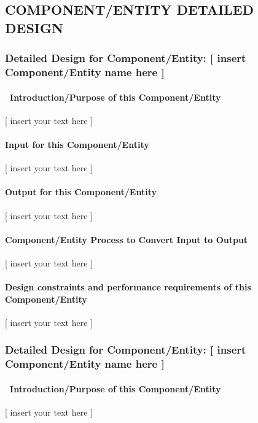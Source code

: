 \documentclass[twoside,letterpaper]{article}
\begin{document}
\subsection[COMPONENT/ENTITY DETAILED
DESIGN]{\bfseries\color{black} COMPONENT/ENTITY
DETAILED DESIGN}
\subsubsection{Detailed Design for Component/Entity: [ insert
Component/Entity name here ]}
\paragraph[\ Introduction/Purpose of this
Component/Entity]{\ Introduction/Purpose of this Component/Entity}
{\color{black}
[ insert your text here ]}

\paragraph[Input for this Component/Entity]{Input for this
Component/Entity}
{\color{black}
[ insert your text here ]}

\paragraph{Output for this Component/Entity}
{\color{black}
[ insert your text here ]}

\paragraph{Component/Entity Process to Convert Input to Output}
{\color{black}
[ insert your text here ]}

\paragraph{Design constraints and performance requirements of this
Component/Entity}
{\color{black}
[ insert your text here ]}

\subsubsection{Detailed Design for Component/Entity: [ insert
Component/Entity name here ]}
\paragraph[\ Introduction/Purpose of this
Component/Entity]{\ Introduction/Purpose of this Component/Entity}
{\color{black}
[ insert your text here ]}
\end{document}
